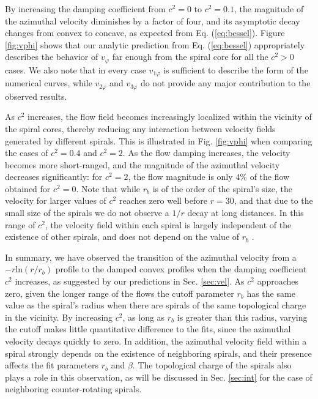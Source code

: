 \documentclass[preprint,prx,floatfix]{revtex4-1}
\begin{document}
By increasing the damping coefficient from $c^2=0$ to $c^2 = 0.1$, the magnitude of the azimuthal velocity diminishes by a factor of four, and its asymptotic decay changes from convex to concave, as expected from Eq. (\ref{eq:bessel}). Figure \ref{fig:vphi} shows that our analytic prediction from Eq. (\ref{eq:bessel}) appropriately describes the behavior of $v_\varphi$ far enough from the spiral core for all the $c^2>0$ cases. We also note that in every case $v_{1\varphi}$ is sufficient to describe the form of the numerical curves, while $v_{2\varphi}$ and $v_{3\varphi}$ do not provide any major contribution to the observed results. 

As $c^2$ increases, the flow field becomes increasingly localized within the vicinity of the spiral cores, thereby reducing any interaction between velocity fields generated by different spirals. This is illustrated in Fig. \ref{fig:vphi} when comparing the cases of $c^2 = 0.4$ and $c^2 = 2$. 
As the flow damping increases, the velocity becomes more short-ranged, and the magnitude of the azimuthal velocity decreases significantly: for $c^2 = 2$, the flow magnitude is only $4\%$ of the flow obtained for $c^2 = 0$. Note that while $r_b$ is of the order of the spiral's size, the velocity for larger values of $c^2$ reaches zero well before $r = 30$, and that due to the small size of the spirals we do not observe a $1/r$ decay at long distances. In this range of $c^{2}$,  the velocity field within each spiral is largely independent of the existence of other spirals, and does not depend on the value of $r_{b}$ \cite{cross1996theoretical}.

In summary, we have observed the transition of the azimuthal velocity  from a $-r\textrm{ln}(r/r_b)$ profile to the damped convex profiles when the damping coefficient $c^2$ increases, as suggested by our predictions in Sec. \ref{sec:vel}. As $c^2$ approaches zero, given the longer range of the flows the cutoff parameter $r_b$ has the same value as the spiral's radius when there are spirals of the same topological charge in the vicinity. By increasing $c^2$, as long as $r_b$ is greater than this radius, varying the cutoff makes little quantitative difference to the fits, since the azimuthal velocity decays quickly to zero. In addition, the azimuthal velocity field within a spiral strongly depends on the existence of neighboring spirals, and their presence affects the fit parameters $r_b$ and $\beta$. The topological charge of the spirals also plays a role in this observation, as will be discussed in Sec. \ref{sec:int} for the case of neighboring counter-rotating spirals.
\end{document}
